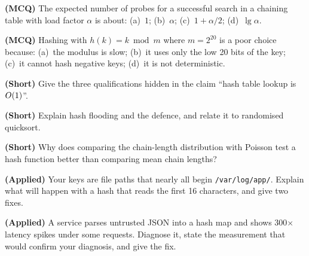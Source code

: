 \begin{reviewq}
  \item \textbf{(MCQ)} The expected number of probes for a successful search in
        a chaining table with load factor $\alpha$ is about:
        (a)~$1$; (b)~$\alpha$; (c)~$1 + \alpha/2$; (d)~$\lg \alpha$.
  \item \textbf{(MCQ)} Hashing with $h(k) = k \bmod m$ where $m = 2^{20}$ is a
        poor choice because: (a)~the modulus is slow; (b)~it uses only the low
        20 bits of the key; (c)~it cannot hash negative keys; (d)~it is not
        deterministic.
  \item \textbf{(Short)} Give the three qualifications hidden in the claim
        ``hash table lookup is $O(1)$''.
  \item \textbf{(Short)} Explain hash flooding and the defence, and relate it
        to randomised quicksort.
  \item \textbf{(Short)} Why does comparing the chain-length distribution with
        Poisson test a hash function better than comparing mean chain lengths?
  \item \textbf{(Applied)} Your keys are file paths that nearly all begin
        \texttt{/var/log/app/}. Explain what will happen with a hash that reads
        the first 16 characters, and give two fixes.
  \item \textbf{(Applied)} A service parses untrusted JSON into a hash map and
        shows 300$\times$ latency spikes under some requests. Diagnose it, state
        the measurement that would confirm your diagnosis, and give the fix.
\end{reviewq}
